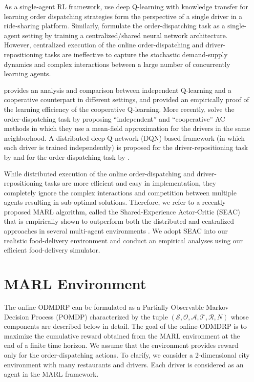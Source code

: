 \documentclass{article}
\theoremstyle{defn}
\theoremstyle{prop}
\theoremstyle{assm}
\theoremstyle{theoremm}
\theoremstyle{remarkk}
\theoremstyle{lem}
\theoremstyle{example}
\theoremstyle{example}
\begin{document}
As a single-agent RL framework, \cite{wang2018deep} use deep Q-learning with knowledge transfer for learning order dispatching strategies form the perspective of a single driver in a ride-sharing platform. Similarly, \cite{xu2018large} formulate the order-dispatching task as a single-agent setting by training a centralized/shared neural network architecture. However, centralized execution of the online order-dispatching and driver-repositioning tasks are ineffective to capture the stochastic demand-supply dynamics and complex interactions between a large number of concurrently learning agents. 

\cite{tan1993multi} provides an analysis and comparison between independent Q-learning and a cooperative counterpart in different settings, and provided an empirically proof of the learning efficiency of the cooperative Q-learning. More recently, \cite{Li2019} solve the order-dispatching task by proposing \enquote{independent} and \enquote{cooperative} AC methods in which they use a mean-field approximation for the drivers in the same neighborhood. A distributed deep Q-network (DQN)-based framework (in which each driver is trained independently) is proposed for the driver-repositioning task by \cite{oda2018movi} and for the order-dispatching task by \cite{al2019deeppool}.

While distributed execution of the online order-dispatching and driver-repositioning tasks are more efficient and easy in implementation, they completely ignore the complex interactions and competition between multiple agents resulting in sub-optimal solutions. Therefore, we refer to a recently proposed MARL algorithm, called the Shared-Experience Actor-Critic (SEAC) that is empirically shown to outperform both the distributed and centralized approaches in several multi-agent environments \citep{christianos2020shared}. We adopt SEAC into our realistic food-delivery environment and conduct an empirical analyses using our efficient food-delivery simulator. 
\section{MARL Environment}\label{env}
The online-ODMDRP can be formulated as a Partially-Observable Markov Decision Process (POMDP) characterized by the tuple $\left(\mathcal{S}, \mathcal{O}, \mathcal{A}, \mathcal{T}, \mathcal{R}, N \right)$ whose components are described below in detail. The goal of the online-ODMDRP is to maximize the cumulative reward obtained from the MARL environment at the end of a finite time horizon. We assume that the environment provides reward only for the order-dispatching actions. To clarify, we consider a 2-dimensional city environment with many restaurants and drivers. Each driver is considered as an agent in the MARL framework. 
\end{document}
